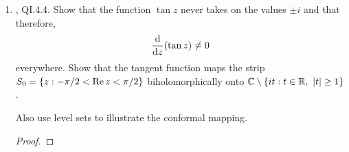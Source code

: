 \documentclass[../psets.tex]{subfiles}
\begin{document}
\begin{enumerate}[ref={A.\arabic*}]
\begin{proof}
\begin{align*}
            |z_1| &\leq \frac{1}{\liminf_{k\to\infty}\sqrt[k]{|a_k|}}
        \end{align*}
        Moreover, since the limit superior is always greater than or equal to the limit inferior of a sequence of real numbers and hence the reciprocal of the limit superior is less than or equal to the limit inferior, the left statement above is the stronger condition. Therefore, we have a well-defined upper bound on $|z_1|$ in the extended real numbers, which should be exactly the radius of convergence by definition. This verifies the Cauchy-Hadamard formula.
    \end{proof}
    \item \textcite{bib:FischerLieb}, QI.4.4. Show that the function $\tan z$ never takes on the values $\pm i$ and that therefore,
    \begin{equation*}
        \dv{z}(\tan z) \neq 0
    \end{equation*}
    everywhere. Show that the tangent function maps the strip $S_0=\{z:-\pi/2<\operatorname{Re} z<\pi/2\}$ biholomorphically onto $\mathbb{C}\setminus\{it:t\in\mathbb{R},\ |t|\geq 1\}$.\par
    Also use level sets to illustrate the conformal mapping.
    \begin{proof}


\end{proof}
\end{enumerate}
\end{document}

